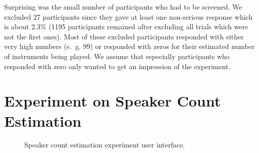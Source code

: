 
Surprising was the small number of participants who had to be screened. We excluded 27 participants since they gave at least one non-serious response which is about 2.3\% (1195 participants remained after excluding all trials which were not the first ones). Most of these excluded participants responded with either very high numbers (e.~g. 99) or responded with zeros for their estimated number of instruments being played. We assume that especially participants who responded with zero only wanted to get an impression of the experiment.

\section{Experiment on Speaker Count Estimation}%
\label{sec:count_experiment}


\begin{figure}[htb]
	\centering
	\caption{Speaker count estimation experiment user interface.}
	\label{fig:user_interface_speaker}
\end{figure}

